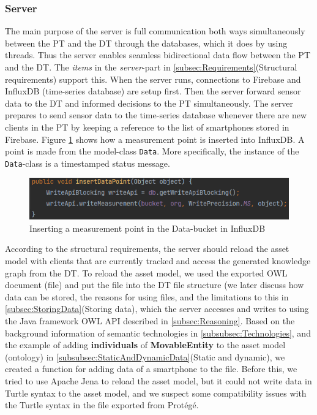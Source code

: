 \documentclass{article}
\begin{document}
\subsubsection{Server}
The main purpose of the server is full communication both ways simultaneously between the PT and the DT through the databases, which it does by using threads. Thus the server enables seamless bidirectional data flow between the PT and the DT. The \emph{items} in the \emph{server}-part in \ref{subsec:Requirements}(Structural requirements) support this. When the server runs, connections to Firebase and InfluxDB (time-series database) are setup first. Then the server forward sensor data to the DT and informed decisions to the PT simultaneously. The server prepares to send sensor data to the time-series database whenever there are new clients in the PT by keeping a reference to the list of smartphones stored in Firebase. Figure \ref{fig:insert_point} shows how a measurement point is inserted into InfluxDB. A point is made from the model-class \verb|Data|. More specifically, the instance of the \verb|Data|-class is a timestamped status message.

\begin{figure}[H]
    \centering
    \includegraphics[scale=0.70]{graphics/insert_point.png}
    \caption{Inserting a measurement point in the Data-bucket in InfluxDB}
    \label{fig:insert_point}
\end{figure}

According to the structural requirements, the server should reload the asset model with clients that are currently tracked and access the generated knowledge graph from the DT. To reload the asset model, we used the exported OWL document (file) and put the file into the DT file structure (we later discuss how data can be stored, the reasons for using files, and the limitations to this in \ref{subsec:StoringData}(Storing data), which the server accesses and writes to using the Java framework OWL API described in \ref{subsec:Reasoning}. Based on the background information of semantic technologies in \ref{subsubsec:Technologies}, and the example of adding \textbf{individuals} of \textbf{MovableEntity} to the asset model (ontology) in \ref{subsubsec:StaticAndDynamicData}(Static and dynamic), we created a function for adding data of a smartphone to the file. Before this, we tried to use Apache Jena to reload the asset model, but it could not write data in Turtle syntax to the asset model, and we suspect some compatibility issues with the Turtle syntax in the file exported from Protégé.
\end{document}
